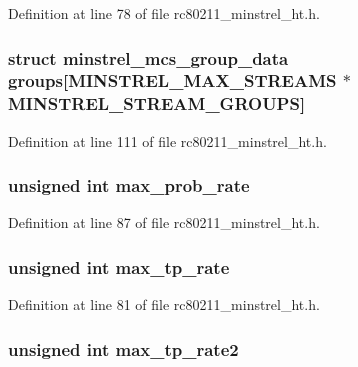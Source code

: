 Definition at line 78 of file rc80211\-\_\-minstrel\-\_\-ht.\-h.

\hypertarget{structminstrel__ht__sta_ae1ef634bc381d48809efc8efdf2757c2}{
\subsubsection[{groups}]{\setlength{\rightskip}{0pt plus 5cm}struct {\bf minstrel\-\_\-mcs\-\_\-group\-\_\-data} groups\mbox{[}{\bf M\-I\-N\-S\-T\-R\-E\-L\-\_\-\-M\-A\-X\-\_\-\-S\-T\-R\-E\-A\-M\-S} $\ast${\bf M\-I\-N\-S\-T\-R\-E\-L\-\_\-\-S\-T\-R\-E\-A\-M\-\_\-\-G\-R\-O\-U\-P\-S}\mbox{]}}}\label{structminstrel__ht__sta_ae1ef634bc381d48809efc8efdf2757c2}


Definition at line 111 of file rc80211\-\_\-minstrel\-\_\-ht.\-h.

\hypertarget{structminstrel__ht__sta_a4a4625871f05851116acae11b392a957}{
\subsubsection[{max\-\_\-prob\-\_\-rate}]{\setlength{\rightskip}{0pt plus 5cm}unsigned int max\-\_\-prob\-\_\-rate}}\label{structminstrel__ht__sta_a4a4625871f05851116acae11b392a957}


Definition at line 87 of file rc80211\-\_\-minstrel\-\_\-ht.\-h.

\hypertarget{structminstrel__ht__sta_ae61b14461f5cfea710f666fe40906493}{
\subsubsection[{max\-\_\-tp\-\_\-rate}]{\setlength{\rightskip}{0pt plus 5cm}unsigned int max\-\_\-tp\-\_\-rate}}\label{structminstrel__ht__sta_ae61b14461f5cfea710f666fe40906493}


Definition at line 81 of file rc80211\-\_\-minstrel\-\_\-ht.\-h.

\hypertarget{structminstrel__ht__sta_aaa4f3e0147c91173f7dd6d86b82ba0ee}{
\subsubsection[{max\-\_\-tp\-\_\-rate2}]{\setlength{\rightskip}{0pt plus 5cm}unsigned int max\-\_\-tp\-\_\-rate2}}\label{structminstrel__ht__sta_aaa4f3e0147c91173f7dd6d86b82ba0ee}


